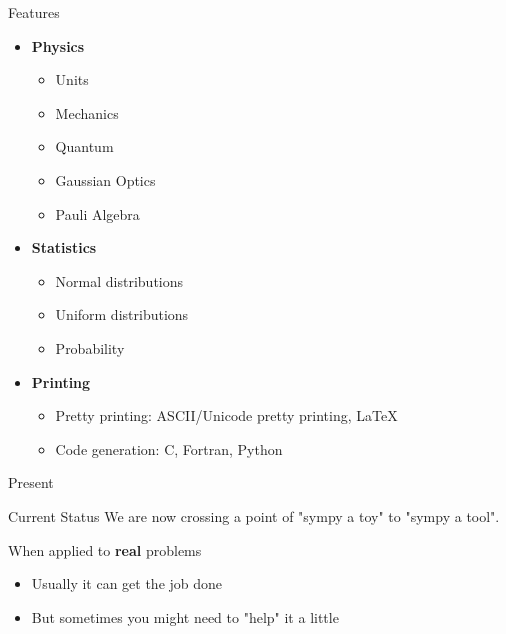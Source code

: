 \documentclass[xcolor=svgnames]{beamer}
\begin{document}
\begin{frame}{Features}
\begin{multicols}{2}
\begin{itemize}
    \item \textbf{Physics}
      \begin{itemize}
        \tiny
      \item Units
      \item Mechanics
      \item Quantum
      \item Gaussian Optics
      \item Pauli Algebra
      \end{itemize}

    \item \textbf{Statistics}
      \begin{itemize}
        \tiny
      \item Normal distributions
      \item Uniform distributions
      \item Probability
      \end{itemize}

    \item \textbf{Printing}
      \begin{itemize}
        \tiny
      \item Pretty printing: ASCII/Unicode pretty printing, LaTeX
      \item Code generation: C, Fortran, Python
      \end{itemize}
    \end{itemize}
  \end{multicols}
\end{frame}

\begin{frame}{Present}
  \begin{block}{Current Status}
    We are now crossing a point of "sympy a toy" to "sympy a tool".
  \end{block}
  \pause
  \bigskip
  \begin{block}{When applied to \textbf{real} problems}
    \begin{itemize}
    \item Usually it can get the job done
    \item But sometimes you might need to "help" it a little
    \end{itemize}
  \end{block}
\end{frame}
\end{document}
